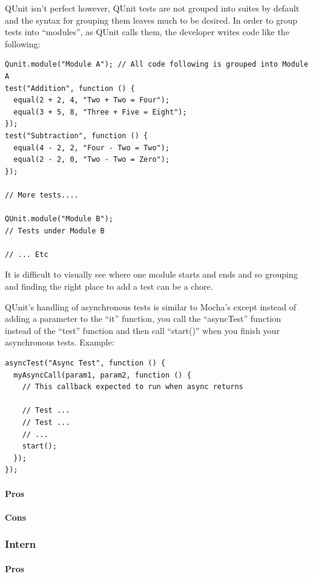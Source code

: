 \documentclass[11pt]{article}
\begin{document}
QUnit isn't perfect however, QUnit tests are not grouped into suites by default and the syntax for grouping them leaves much to be desired. In order to group tests into ``modules'', as QUnit calls them, the developer writes code like the following:
\begin{lstlisting}
Qunit.module("Module A"); // All code following is grouped into Module A
test("Addition", function () {
  equal(2 + 2, 4, "Two + Two = Four");
  equal(3 + 5, 8, "Three + Five = Eight");
});
test("Subtraction", function () {
  equal(4 - 2, 2, "Four - Two = Two");
  equal(2 - 2, 0, "Two - Two = Zero");
});

// More tests....

QUnit.module("Module B");
// Tests under Module B

// ... Etc
\end{lstlisting}
It is difficult to visually see where one module starts and ends and so grouping and finding the right place to add a test can be a chore.

QUnit's handling of asynchronous tests is similar to Mocha's except instead of adding a parameter to the ``it'' function, you call the ``asyncTest'' function instead of the ``test'' function and then call ``start()'' when you finish your asynchronous tests. Example:
\begin{lstlisting}
asyncTest("Async Test", function () {
  myAsyncCall(param1, param2, function () {
    // This callback expected to run when async returns

    // Test ...
    // Test ...
    // ...
    start();
  });
});
\end{lstlisting}

\paragraph{Pros}

\paragraph{Cons}

\subsubsection{Intern}

\paragraph{Pros}
\end{document}
